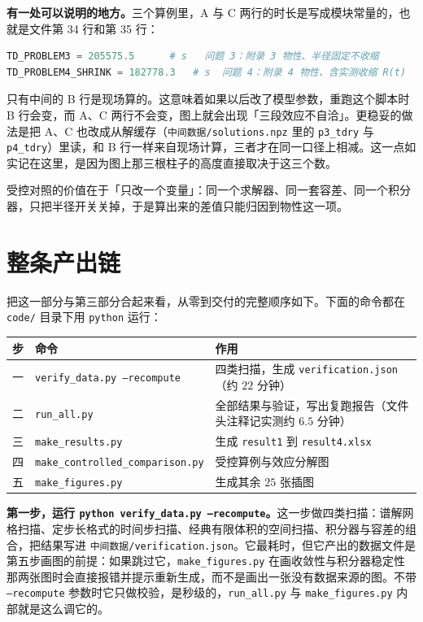\textbf{有一处可以说明的地方。}三个算例里，A 与 C 两行的时长是写成模块常量的，也就是文件第 34 行和第 35 行：

\begin{lstlisting}[language=Python]
TD_PROBLEM3 = 205575.5      # s   问题 3：附录 3 物性、半径固定不收缩
TD_PROBLEM4_SHRINK = 182778.3   # s  问题 4：附录 4 物性、含实测收缩 R(t)
\end{lstlisting}

只有中间的 B 行是现场算的。这意味着如果以后改了模型参数，重跑这个脚本时 B 行会变，而 A、C 两行不会变，图上就会出现「三段效应不自洽」。更稳妥的做法是把 A、C 也改成从解缓存（\texttt{中间数据/solutions.npz} 里的 \texttt{p3\_tdry} 与 \texttt{p4\_tdry}）里读，和 B 行一样来自现场计算，三者才在同一口径上相减。这一点如实记在这里，是因为图上那三根柱子的高度直接取决于这三个数。

\keypoint
受控对照的价值在于「只改一个变量」：同一个求解器、同一套容差、同一个积分器，只把半径开关关掉，于是算出来的差值只能归因到物性这一项。

\section{整条产出链}

把这一部分与第三部分合起来看，从零到交付的完整顺序如下。下面的命令都在 \texttt{code/} 目录下用 \texttt{python} 运行：

\begin{center}
\begin{tabular}{@{}clp{8.6cm}@{}}
\toprule
步 & 命令 & 作用 \\
\midrule
一 & \texttt{verify\_data.py --recompute} & 四类扫描，生成 \texttt{verification.json}（约 $22$ 分钟） \\
二 & \texttt{run\_all.py} & 全部结果与验证，写出复跑报告（文件头注释记实测约 $6.5$ 分钟） \\
三 & \texttt{make\_results.py} & 生成 \texttt{result1} 到 \texttt{result4.xlsx} \\
四 & \texttt{make\_controlled\_comparison.py} & 受控算例与效应分解图 \\
五 & \texttt{make\_figures.py} & 生成其余 $25$ 张插图 \\
\bottomrule
\end{tabular}
\end{center}

\textbf{第一步，运行 \texttt{python verify\_data.py --recompute}。}这一步做四类扫描：谱解网格扫描、定步长格式的时间步扫描、经典有限体积的空间扫描、积分器与容差的组合，把结果写进 \texttt{中间数据/verification.json}。它最耗时，但它产出的数据文件是第五步画图的前提：如果跳过它，\texttt{make\_figures.py} 在画收敛性与积分器稳定性那两张图时会直接报错并提示重新生成，而不是画出一张没有数据来源的图。不带 \texttt{--recompute} 参数时它只做校验，是秒级的，\texttt{run\_all.py} 与 \texttt{make\_figures.py} 内部就是这么调它的。

